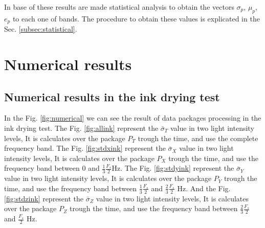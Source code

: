 \documentclass[review]{elsarticle}
\begin{document}
In base of these results are made statistical analysis to obtain the 
vectors $\sigma_p$, $\mu_p$, $e_p$ to each one of bands. 
The procedure to obtain these values is explicated in the Sec. \ref{subsec:statistical}.


\section{Numerical results} 
\label{sec:numerical}

\subsection{Numerical results in the ink drying test} 
\label{subsec:numericalink}
In the Fig. \ref{fig:numerical} we can see the result of data packages processing 
 in the ink drying test. The Fig. \ref{fig:allink}
represent the $\bar{\sigma}_T$ value in two light intensity levels, It is calculates over the package $P_T$
trough the time, and use the complete frequency band.
The Fig. \ref{fig:stdxink}
represent the $\bar{\sigma}_X$ value in two light intensity levels, It is calculates over the package $P_X$
trough the time, and use the frequency band between $0$ and $\frac{1}{3}\frac{F_s}{2}$Hz.
The Fig. \ref{fig:stdyink}
represent the $\bar{\sigma}_Y$ value in two light intensity levels, It is calculates over the package $P_Y$
trough the time, and use the frequency band between $\frac{1}{3}\frac{F_s}{2}$ and $\frac{2}{3}\frac{F_s}{2}$ Hz.
And the Fig. \ref{fig:stdzink}
represent the $\bar{\sigma}_Z$ value in two light intensity levels, It is calculates over the package $P_Z$
trough the time, and use the frequency band between $\frac{2}{3}\frac{F_s}{2}$ and $\frac{F_s}{2}$ Hz.
\end{document}
